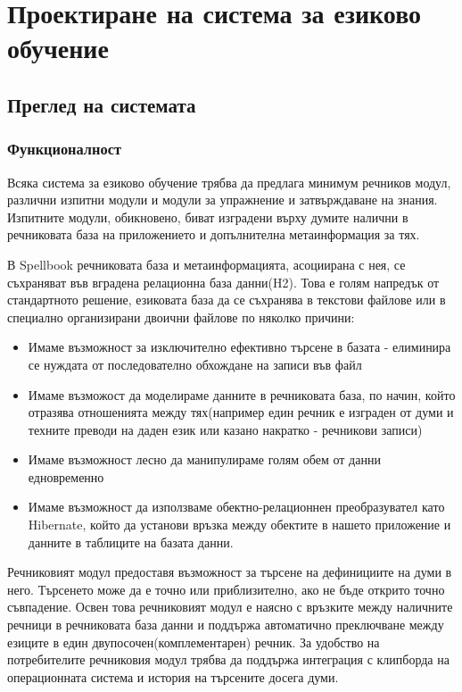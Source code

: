 \chapter{Проектиране на система за езиково обучение}
\section{Преглед на системата}
\subsection{Функционалност}
Всяка система за езиково обучение трябва да предлага минимум речников
модул, различни изпитни модули и модули за упражнение и затвърждаване
на знания. Изпитните модули, обикновено, биват
изградени върху думите налични в речниковата база на приложението и
допълнителна метаинформация за тях. 

В Spellbook речниковата база и метаинформацията, асоциирана с нея, се
съхраняват във вградена релационна база данни(H2). Това е голям
напредък от стандартното решение, езиковата база да се съхранява в
текстови файлове или в специално организирани двоични файлове по
няколко причини:
\begin{itemize}
  \item Имаме възможност за изключително ефективно търсене в базата -
    елиминира се нуждата от последователно обхождане на записи във файл
  \item Имаме възможост да моделираме данните в речниковата база, по
    начин, който отразява отношенията между тях(например един речник е
    изграден от думи и техните преводи на даден език или казано
    накратко - речникови записи)
  \item Имаме възможност лесно да манипулираме голям обем от данни
    едновременно
  \item Имаме възможност да използваме обектно-релационнен
    преобразувател като Hibernate, който да установи връзка между
    обектите в нашето приложение и данните в таблиците на базата данни.
\end{itemize}

Речниковият модул предоставя възможност за търсене на дефинициите на
думи в него. Търсенето може да е точно или приблизително, ако не бъде
открито точно съвпадение. Освен това речниковият модул е наясно с
връзките между наличните речници в речниковата база данни и поддържа
автоматично преключване между езиците в един
двупосочен(комплементарен) речник. За удобство на потребителите
речниковия модул трябва да поддържа интеграция с клипборда на
операционната система и история на търсените досега думи.

